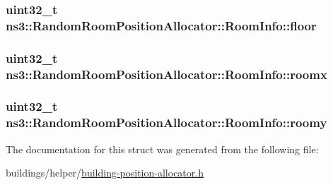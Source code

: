 \subsubsection[{\texorpdfstring{floor}{floor}}]{\setlength{\rightskip}{0pt plus 5cm}uint32\+\_\+t ns3\+::\+Random\+Room\+Position\+Allocator\+::\+Room\+Info\+::floor}\hypertarget{structns3_1_1RandomRoomPositionAllocator_1_1RoomInfo_a57a93a9c7c6e9fbda0ff9865a7b13a35}{}\label{structns3_1_1RandomRoomPositionAllocator_1_1RoomInfo_a57a93a9c7c6e9fbda0ff9865a7b13a35}
\subsubsection[{\texorpdfstring{roomx}{roomx}}]{\setlength{\rightskip}{0pt plus 5cm}uint32\+\_\+t ns3\+::\+Random\+Room\+Position\+Allocator\+::\+Room\+Info\+::roomx}\hypertarget{structns3_1_1RandomRoomPositionAllocator_1_1RoomInfo_a64a841ca3802c8244f5adcdf335ded92}{}\label{structns3_1_1RandomRoomPositionAllocator_1_1RoomInfo_a64a841ca3802c8244f5adcdf335ded92}
\subsubsection[{\texorpdfstring{roomy}{roomy}}]{\setlength{\rightskip}{0pt plus 5cm}uint32\+\_\+t ns3\+::\+Random\+Room\+Position\+Allocator\+::\+Room\+Info\+::roomy}\hypertarget{structns3_1_1RandomRoomPositionAllocator_1_1RoomInfo_adc2a4e7b27cde4f8ee8f548cbdf587f0}{}\label{structns3_1_1RandomRoomPositionAllocator_1_1RoomInfo_adc2a4e7b27cde4f8ee8f548cbdf587f0}


The documentation for this struct was generated from the following file\+:\begin{DoxyCompactItemize}
\item 
buildings/helper/\hyperlink{building-position-allocator_8h}{building-\/position-\/allocator.\+h}\end{DoxyCompactItemize}
